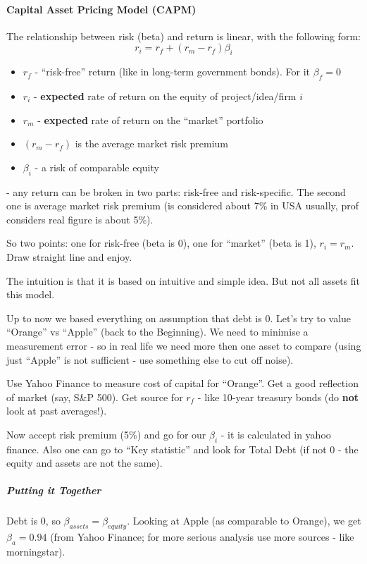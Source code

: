 \documentclass{scrartcl}
\begin{document}

\paragraph{Capital Asset Pricing Model (CAPM)}

The relationship between risk (beta) and return is linear, with the following
form:
$$r_i = r_f + (r_m - r_f)\beta_i$$
\begin{itemize}
\item $r_f$ - ``risk-free'' return (like in long-term government bonds). For it
  $\beta_f = 0$
\item $r_i$ - {\bf expected } rate of return on the equity of project/idea/firm
  $i$
\item $r_m$ - {\bf expected} rate of return on the ``market'' portfolio
\item $(r_m - r_f)$ is the average market risk premium
\item $\beta_i$ - a risk of comparable equity
\end{itemize}
- any return can be broken in two parts: risk-free and risk-specific. The second
one is average market risk premium (is considered about 7\% in USA usually, prof
considers real figure is about 5\%).

So two points: one for risk-free (beta is 0), one for ``market'' (beta is 1),
$r_i = r_m$. Draw straight line and enjoy.

The intuition is that it is based on intuitive and simple idea. But not all
assets fit this model.

Up to now we based everything on assumption that debt is 0. Let's try to value
``Orange'' vs ``Apple'' (back to the Beginning). We need to minimise a
measurement error - so in real life we need more then one asset to compare
(using just ``Apple'' is not sufficient - use something else to cut off noise).

Use Yahoo Finance to measure cost of capital for ``Orange''. Get a good
reflection of market (say, S\&P 500). Get source for $r_f$ - like 10-year
treasury bonds (do {\bf not} look at past averages!).

Now accept risk premium (5\%) and go for our $\beta_i$ - it is calculated in
yahoo finance. Also one can go to ``Key statistic'' and look for Total Debt (if
not 0 - the equity and assets are not the same).  

\subparagraph{Putting it Together}

Debt is 0, so $\beta_{assets} = \beta_{equity}$. Looking at Apple (as comparable
to Orange), we get $\beta_a = 0.94$ (from Yahoo Finance; for more serious
analysis use more sources - like morningstar). 
\end{document}
